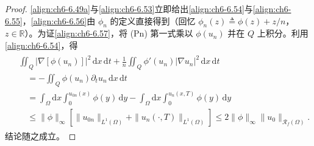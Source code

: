 \documentclass[../../main.tex]{subfiles}%
\begin{document}
\begin{proof}
\eqref{align:ch6-6.49a}与\eqref{align:ch6-6.53}立即给出\eqref{align:ch6-6.54}与\eqref{align:ch6-6.55}，\eqref{align:ch6-6.56}由 $\phi_n$ 的定义直接得到（回忆 $\phi_n(z)\triangleq\phi(z)+z/n$，$z\in\mathbb{R}$）。为证\eqref{align:ch6-6.57}，将 (Pn) 第一式乘以 $\phi(u_n)$ 并在 $Q$ 上积分。利用\eqref{align:ch6-6.54}，得
\begin{align*}
\begin{aligned}
&\iint_Q|\nabla[\phi(u_n)]|^2\,\mathrm{d}x\,\mathrm{d}t
+\frac{1}{n}\iint_Q\phi'(u_n)|\nabla u_n|^2\,\mathrm{d}x\,\mathrm{d}t\\
&\quad=-\iint_Q\phi(u_n)\partial_tu_n\,\mathrm{d}x\,\mathrm{d}t\\
&\quad=\int_\Omega\mathrm{d}x\int_0^{u_{0n}(x)}\phi(y)\,\mathrm{d}y
-\int_\Omega\mathrm{d}x\int_0^{u_n(x,T)}\phi(y)\,\mathrm{d}y\\
&\quad\leqslant\|\phi\|_\infty[\|u_{0n}\|_{L^1(\Omega)}+\|u_n(\cdot,T)\|_{L^1(\Omega)}]
\leqslant2\|\phi\|_\infty\|u_0\|_{\mathscr{R}_f(\Omega)}.
\end{aligned}
\end{align*}
结论随之成立。
\end{proof}
\end{document}
